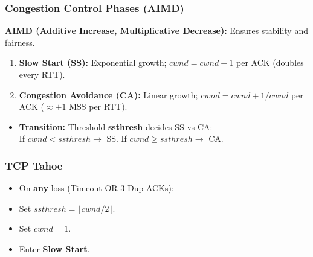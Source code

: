 \subsubsection{Congestion Control Phases (AIMD)}
\textbf{AIMD (Additive Increase, Multiplicative Decrease):} Ensures stability and fairness.
\begin{enumerate}
    \item \textbf{Slow Start (SS):} Exponential growth; $cwnd = cwnd + 1$ per ACK (doubles every RTT).
    \item \textbf{Congestion Avoidance (CA):} Linear growth; $cwnd = cwnd + 1/cwnd$ per ACK ($\approx +1$ MSS per RTT).
\end{enumerate}
\begin{itemize}
    \item \textbf{Transition:} Threshold \textbf{ssthresh} decides SS vs CA: \\ If $cwnd < ssthresh \to$ SS. If $cwnd \ge ssthresh \to$ CA.
\end{itemize}

\subsubsection{TCP Tahoe}
\begin{itemize}
    \item On \textbf{any} loss (Timeout OR 3-Dup ACKs):
    \item Set $ssthresh = \lfloor cwnd/2 \rfloor$.
    \item Set $cwnd = 1$.
    \item Enter \textbf{Slow Start}.
\end{itemize}


